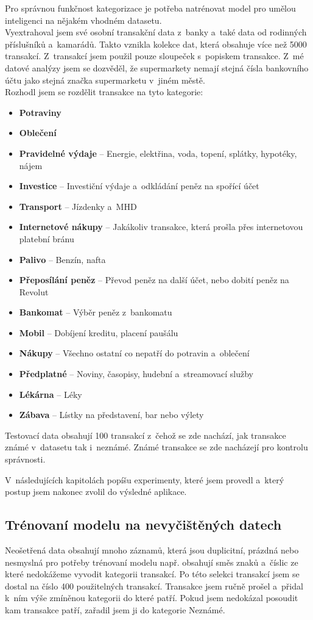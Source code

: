 Pro správnou funkčnost kategorizace je potřeba natrénovat model pro umělou inteligenci na nějakém vhodném datasetu. 
\\
Vyextrahoval jsem své osobní transakční data z~banky a~také data od rodinných příslušníků a~kamarádů. Takto vznikla kolekce dat, která obsahuje více než 5000 transakcí. Z~transakcí jsem použil pouze sloupeček s~popiskem transakce. Z~mé datové analýzy jsem se dozvěděl, že supermarkety nemají stejná čísla bankovního účtu jako stejná značka supermarketu v~jiném městě. 
\\
Rozhodl jsem se rozdělit transakce na tyto kategorie:
\begin{itemize}
    \item \textbf{Potraviny}
    \item \textbf{Oblečení}
    \item \textbf{Pravidelné výdaje} -- Energie, elektřina, voda, topení, splátky, hypotéky, nájem
    \item \textbf{Investice} -- Investiční výdaje a~odkládání peněz na spořící účet
    \item \textbf{Transport} -- Jízdenky a~MHD
    \item \textbf{Internetové nákupy} -- Jakákoliv transakce, která prošla přes internetovou platební bránu
    \item \textbf{Palivo} -- Benzín, nafta
    \item \textbf{Přeposílání peněz} -- Převod peněz na další účet, nebo dobití peněz na Revolut
    \item \textbf{Bankomat} -- Výběr peněz z~bankomatu 
    \item \textbf{Mobil} -- Dobíjení kreditu, placení paušálu
    \item \textbf{Nákupy} -- Všechno ostatní co nepatří do potravin a~oblečení
    \item \textbf{Předplatné} -- Noviny, časopisy, hudební a~streamovací služby
    \item \textbf{Lékárna} -- Léky
    \item \textbf{Zábava} -- Lístky na představení, bar nebo výlety    
\end{itemize}

Testovací data obsahují 100 transakcí z~čehož se zde nachází, jak transakce známé v~datasetu tak i~neznámé. Známé transakce se zde nacházejí pro kontrolu správnosti.

V~následujících kapitolách popíšu experimenty, které jsem provedl a~který postup jsem nakonec zvolil do výsledné aplikace. 
\subsection{Trénovaní modelu na nevyčištěných datech}
Neošetřená data obsahují mnoho záznamů, která jsou duplicitní, prázdná nebo nesmyslná pro potřeby trénovaní modelu např. obsahují směs znaků a~číslic ze které nedokážeme vyvodit kategorii transakcí. Po této selekci transakcí jsem se dostal na číslo 400 použitelných transakcí. Transakce jsem ručně prošel a~přidal k~ním výše zmíněnou kategorii do které patří. Pokud jsem nedokázal posoudit kam transakce patří, zařadil jsem ji do kategorie Neznámé.




